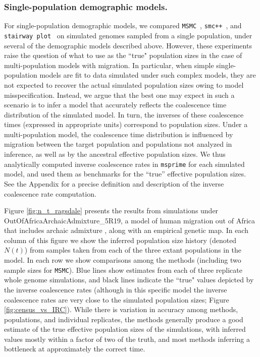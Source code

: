 \documentclass[12pt,halfline,a4paper]{ouparticle}
\newcommand{\MSMC}{\texttt{MSMC}\xspace}
\newcommand{\smcpp}{\texttt{smc++}\xspace}
\newcommand{\stairwayplot}{\texttt{stairway plot}\xspace}
\begin{document}
\subsubsection*{ Single-population demographic models.}
For single-population demographic models, we compared
\MSMC~\citep{schiffels2014inferring}, \smcpp~\citep{terhorst2017robust}, and
\stairwayplot~\citep{liu2015exploring}
 on simulated genomes sampled from a single population,
under several of the demographic models described above.
However, these experiments raise the question of what to use as the ``true" population sizes in the case of multi-population models with migration.
In particular, when simple single-population models are fit to data simulated under such complex models, 
they are not expected to recover the actual simulated population sizes owing to model misspecification.
Instead, we argue that the best one may expect in such a scenario is to infer a model that accurately reflects the
coalescence time distribution of the simulated model.  In turn, the inverses of these coalescence times (expressed in appropriate units) 
correspond to population sizes.
Under a multi-population model, the coalescence time distribution is influenced by migration between the target population and populations not analyzed in inference,
as well as by the ancestral effective population sizes.
We thus analytically computed inverse coalescence
rates in \texttt{msprime} for each simulated model, and used them as benchmarks for the ``true'' effective population sizes.
See the Appendix for a precise definition and description of the inverse coalescence rate computation.

Figure \ref{fig:n_t_ragsdale} presents the results
from simulations under OutOfAfricaArchaicAdmixture\_5R19,
a model of human migration out of Africa that includes archaic admixture
\citep{ragsdale2019models}, along with an empirical genetic map. In each column of this figure
we show the inferred population size history (denoted $N(t)$)
from samples taken from each of the three extant populations in the model.
In each row we show comparisons among the methods (including two sample sizes for \MSMC).
Blue lines show estimates from each of three replicate whole genome simulations,
and black lines indicate the ``true" values depicted by the inverse coalescence rates (although in this specific model
the inverse coalescence rates are very close to the simulated population sizes;
Figure \ref{fig:census_vs_IRC}).
While there is variation in accuracy among methods, populations, and individual replicates,
the methods generally produce a good estimate
of the true effective population sizes of the simulations, with
inferred values mostly within a factor of two of the truth,
and most methods inferring a bottleneck at approximately the correct time.
\end{document}
